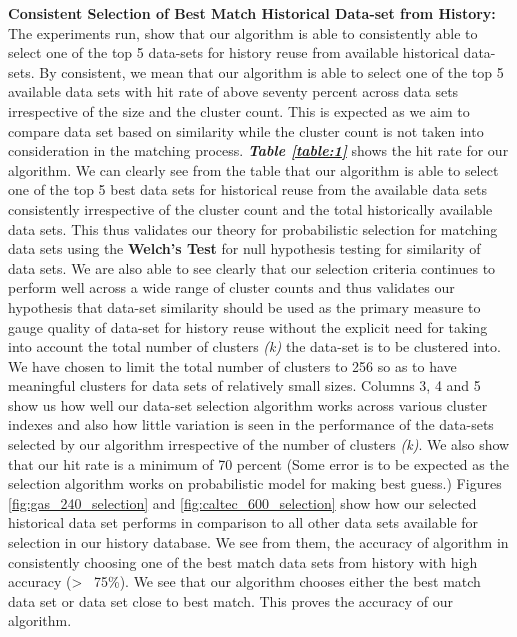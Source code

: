 \documentclass{vldb}
\begin{document}
\textbf{Consistent Selection of Best Match Historical Data-set from History:} The experiments run, show that our algorithm is able to consistently able to select one of the top 5 data-sets for history reuse from available historical data-sets. By consistent, we mean that our algorithm is able to select one of the top 5 available data sets with hit rate of above seventy percent across data sets irrespective of the size and the cluster count. This is expected as we aim to compare data set based on similarity while the cluster count is not taken into consideration in the matching process. \textbf{\textit{Table \ref{table:1}}} shows the hit rate for our algorithm.
We can clearly see from the table that our algorithm is able to select one of the top 5 best data sets for historical reuse from the available data sets consistently irrespective of the cluster count and the total historically available data sets. 
This thus validates our theory for probabilistic selection for matching data sets using the \textbf{Welch's Test} for null hypothesis testing for similarity of data sets. We are also able to see clearly that our selection criteria continues to perform well across a wide range of cluster counts and thus validates our hypothesis that data-set similarity should be used as the primary measure to gauge quality of data-set for history reuse without the explicit need for taking into account the total number of clusters \textit{(k)} the data-set is to be clustered into. We have chosen to limit the total number of clusters to 256 so as to have meaningful clusters for data sets of relatively small sizes.
Columns 3, 4 and 5 show us how well our data-set selection algorithm works across various cluster indexes and also how little variation is seen in the performance of the data-sets selected by our algorithm irrespective of the number of clusters \textit{(k)}. We also show that our hit rate is a minimum of 70 percent (Some error is to be expected as the selection algorithm works on probabilistic model for making best guess.)
Figures \ref{fig:gas_240_selection} and \ref{fig:caltec_600_selection} show how our selected historical data set performs in comparison to all other data sets available for selection in our history database. We  see from them, the accuracy of algorithm in consistently choosing one of the best match data sets from history with high accuracy (>~ 75\%). We see that our algorithm chooses either the best match data set or data set close to best match. This proves the accuracy of our algorithm.
\end{document}
